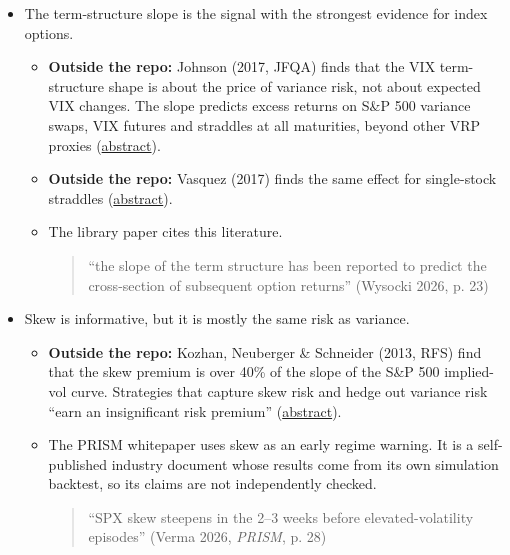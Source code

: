 \documentclass{article}
\begin{document}
\begin{itemize}

\item The term-structure slope is the signal with the strongest evidence for index options.

\begin{itemize}

\item \textbf{Outside the repo:} Johnson (2017, JFQA) finds that the VIX term-structure shape is about the price of variance risk, not about expected VIX changes. The slope predicts excess returns on S\&P 500 variance swaps, VIX futures and straddles at all maturities, beyond other VRP proxies (\href{https://ideas.repec.org/a/cup/jfinqa/v52y2017i06p2461-2490_00.html}{abstract}).

\item \textbf{Outside the repo:} Vasquez (2017) finds the same effect for single-stock straddles (\href{https://ideas.repec.org/a/cup/jfinqa/v52y2017i06p2727-2754_00.html}{abstract}).

\item The library paper cites this literature.

\begin{quote}``the slope of the term structure has been reported to predict the cross-section of subsequent option returns'' (Wysocki 2026, p. 23)\end{quote}

\end{itemize}

\item Skew is informative, but it is mostly the same risk as variance.

\begin{itemize}

\item \textbf{Outside the repo:} Kozhan, Neuberger \& Schneider (2013, RFS) find that the skew premium is over 40\% of the slope of the S\&P 500 implied-vol curve. Strategies that capture skew risk and hedge out variance risk ``earn an insignificant risk premium'' (\href{https://ideas.repec.org/a/oup/rfinst/v26y2013i9p2174-2203.html}{abstract}).

\item The PRISM whitepaper uses skew as an early regime warning. It is a self-published industry document whose results come from its own simulation backtest, so its claims are not independently checked.

\begin{quote}``SPX skew steepens in the 2--3 weeks before elevated-volatility episodes'' (Verma 2026, \emph{PRISM}, p. 28)\end{quote}


\end{itemize}
\end{itemize}
\end{document}
